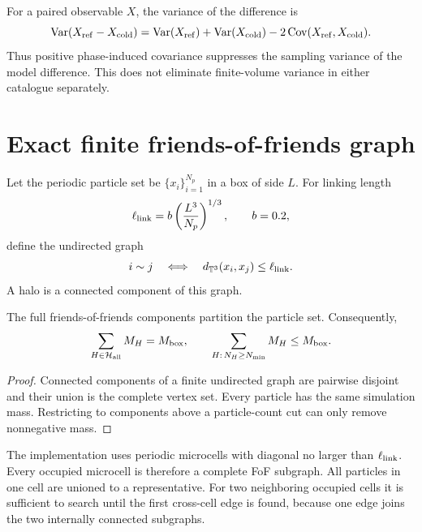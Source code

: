 For a paired observable $X$, the variance of the difference is
\begin{equation}
 \operatorname{Var}(X_{\rm ref}-X_{\rm cold})
 =\operatorname{Var}(X_{\rm ref})+\operatorname{Var}(X_{\rm cold})
 -2\operatorname{Cov}(X_{\rm ref},X_{\rm cold}).
\label{eq:paired-variance}
\end{equation}
Thus positive phase-induced covariance suppresses the sampling variance of the model difference.  This does not eliminate finite-volume variance in either catalogue separately.

\section{Exact finite friends-of-friends graph}

Let the periodic particle set be $\{x_i\}_{i=1}^{N_p}$ in a box of side $L$.  For linking length
\begin{equation}
 \ell_{\rm link}=b\left(\frac{L^3}{N_p}\right)^{1/3},
 \qquad b=0.2,
\label{eq:fof-link}
\end{equation}
define the undirected graph
\begin{equation}
 i\sim j
 \quad\Longleftrightarrow\quad
 d_{\mathbb T^3}(x_i,x_j)\leq\ell_{\rm link}.
\label{eq:fof-edge}
\end{equation}
A halo is a connected component of this graph.

\begin{theorem}
The full friends-of-friends components partition the particle set.  Consequently,
\begin{equation}
 \sum_{H\in\mathcal H_{\rm all}}M_H=M_{\rm box},
 \qquad
 \sum_{H:\,N_H\geq N_{\min}}M_H\leq M_{\rm box}.
\label{eq:fof-mass-partition}
\end{equation}
\end{theorem}

\begin{proof}
Connected components of a finite undirected graph are pairwise disjoint and their union is the complete vertex set.  Every particle has the same simulation mass.  Restricting to components above a particle-count cut can only remove nonnegative mass.
\end{proof}

The implementation uses periodic microcells with diagonal no larger than $\ell_{\rm link}$.  Every occupied microcell is therefore a complete FoF subgraph.  All particles in one cell are unioned to a representative.  For two neighboring occupied cells it is sufficient to search until the first cross-cell edge is found, because one edge joins the two internally connected subgraphs.

